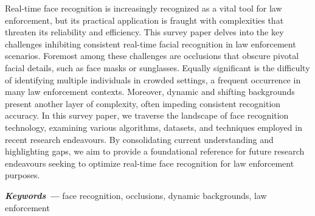 
Real-time face recognition is increasingly recognized as a vital tool for law enforcement, but its practical application is fraught with complexities that threaten its reliability and efficiency. This survey paper delves into the key challenges inhibiting consistent real-time facial recognition in law enforcement scenarios. Foremost among these challenges are occlusions that obscure pivotal facial details, such as face masks or sunglasses. Equally significant is the difficulty of identifying multiple individuals in crowded settings, a frequent occurrence in many law enforcement contexts. Moreover, dynamic and shifting backgrounds present another layer of complexity, often impeding consistent recognition accuracy. In this survey paper, we traverse the landscape of face recognition technology, examining various algorithms, datasets, and techniques employed in recent research endeavours. By consolidating current understanding and highlighting gaps, we aim to provide a foundational reference for future research endeavours seeking to optimize real-time face recognition for law enforcement purposes.

\textbf{\textit{Keywords ---}} face recognition, occlusions, dynamic backgrounds, law enforcement